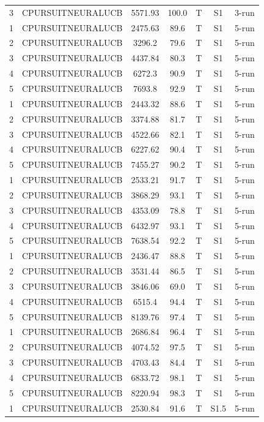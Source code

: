 \documentclass[11pt]{article}
\begin{document}
\begin{center}
\begin{longtable}{|c|c|c|c|c|c|c|}
3 & CPURSUITNEURALUCB & 5571.93 & 100.0 & T & S1 & 3-run \\
1 & CPURSUITNEURALUCB & 2475.63 & 89.6 & T & S1 & 5-run \\
2 & CPURSUITNEURALUCB & 3296.2 & 79.6 & T & S1 & 5-run \\
3 & CPURSUITNEURALUCB & 4437.84 & 80.3 & T & S1 & 5-run \\
4 & CPURSUITNEURALUCB & 6272.3 & 90.9 & T & S1 & 5-run \\
5 & CPURSUITNEURALUCB & 7693.8 & 92.9 & T & S1 & 5-run \\
1 & CPURSUITNEURALUCB & 2443.32 & 88.6 & T & S1 & 5-run \\
2 & CPURSUITNEURALUCB & 3374.88 & 81.7 & T & S1 & 5-run \\
3 & CPURSUITNEURALUCB & 4522.66 & 82.1 & T & S1 & 5-run \\
4 & CPURSUITNEURALUCB & 6227.62 & 90.4 & T & S1 & 5-run \\
5 & CPURSUITNEURALUCB & 7455.27 & 90.2 & T & S1 & 5-run \\
1 & CPURSUITNEURALUCB & 2533.21 & 91.7 & T & S1 & 5-run \\
2 & CPURSUITNEURALUCB & 3868.29 & 93.1 & T & S1 & 5-run \\
3 & CPURSUITNEURALUCB & 4353.09 & 78.8 & T & S1 & 5-run \\
4 & CPURSUITNEURALUCB & 6432.97 & 93.1 & T & S1 & 5-run \\
5 & CPURSUITNEURALUCB & 7638.54 & 92.2 & T & S1 & 5-run \\
1 & CPURSUITNEURALUCB & 2436.47 & 88.8 & T & S1 & 5-run \\
2 & CPURSUITNEURALUCB & 3531.44 & 86.5 & T & S1 & 5-run \\
3 & CPURSUITNEURALUCB & 3846.06 & 69.0 & T & S1 & 5-run \\
4 & CPURSUITNEURALUCB & 6515.4 & 94.4 & T & S1 & 5-run \\
5 & CPURSUITNEURALUCB & 8139.76 & 97.4 & T & S1 & 5-run \\
1 & CPURSUITNEURALUCB & 2686.84 & 96.4 & T & S1 & 5-run \\
2 & CPURSUITNEURALUCB & 4074.52 & 97.5 & T & S1 & 5-run \\
3 & CPURSUITNEURALUCB & 4703.43 & 84.4 & T & S1 & 5-run \\
4 & CPURSUITNEURALUCB & 6833.72 & 98.1 & T & S1 & 5-run \\
5 & CPURSUITNEURALUCB & 8220.94 & 98.3 & T & S1 & 5-run \\
1 & CPURSUITNEURALUCB & 2530.84 & 91.6 & T & S1.5 & 5-run \\

\end{longtable}
\end{center}
\end{document}
